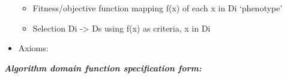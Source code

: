 \documentclass[12pt]{article}
\renewcommand{\_}{\kern-1.5pt\textunderscore\kern-1.5pt}
\begin{document}
\begin{itemize}
\begin{itemize}
\begin{itemize}
\end{itemize}
	\item Fitness/objective function mapping f(x) of each x in Di ‘phenotype’\par

	\item Selection Di -> Ds using f(x) as criteria, x in Di
\end{itemize}\par

	\item Axioms:
\end{itemize}\par

\begin{adjustwidth}{0.5in}{0.0in}
\textbf{\textit{Algorithm domain function specification form:}}\par

\end{adjustwidth}
\end{document}
